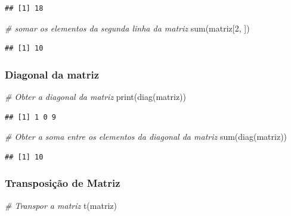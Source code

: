 \documentclass[
]{article}
\newenvironment{Shaded}{\begin{snugshade}}{\end{snugshade}}
\newcommand{\CommentTok}[1]{\textcolor[rgb]{0.56,0.35,0.01}{\textit{#1}}}
\newcommand{\DecValTok}[1]{\textcolor[rgb]{0.00,0.00,0.81}{#1}}
\newcommand{\FunctionTok}[1]{\textcolor[rgb]{0.00,0.00,0.00}{#1}}
\newcommand{\NormalTok}[1]{#1}
\begin{document}
\begin{verbatim}
## [1] 18
\end{verbatim}

\begin{Shaded}
\begin{Highlighting}[]
\CommentTok{\# somar os elementos da segunda linha da matriz}
\FunctionTok{sum}\NormalTok{(matriz[}\DecValTok{2}\NormalTok{, ])}
\end{Highlighting}
\end{Shaded}

\begin{verbatim}
## [1] 10
\end{verbatim}

\hypertarget{diagonal-da-matriz}{%
\subsubsection{\texorpdfstring{\textbf{Diagonal da
matriz}}{Diagonal da matriz}}\label{diagonal-da-matriz}}

\begin{Shaded}
\begin{Highlighting}[]
\CommentTok{\# Obter a diagonal da matriz}
\FunctionTok{print}\NormalTok{(}\FunctionTok{diag}\NormalTok{(matriz))}
\end{Highlighting}
\end{Shaded}

\begin{verbatim}
## [1] 1 0 9
\end{verbatim}

\begin{Shaded}
\begin{Highlighting}[]
\CommentTok{\# Obter a soma entre os elementos da diagonal da matriz}
\FunctionTok{sum}\NormalTok{(}\FunctionTok{diag}\NormalTok{(matriz))}
\end{Highlighting}
\end{Shaded}

\begin{verbatim}
## [1] 10
\end{verbatim}

\hypertarget{transposiuxe7uxe3o-de-matriz}{%
\subsubsection{\texorpdfstring{\textbf{Transposição de
Matriz}}{Transposição de Matriz}}\label{transposiuxe7uxe3o-de-matriz}}

\begin{Shaded}
\begin{Highlighting}[]
\CommentTok{\# Transpor a matriz}
\FunctionTok{t}\NormalTok{(matriz)}
\end{Highlighting}
\end{Shaded}
\end{document}
